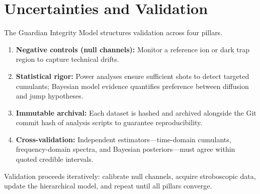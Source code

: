 \section{Uncertainties and Validation}
The Guardian Integrity Model structures validation across four pillars.
\begin{enumerate}
  \item \textbf{Negative controls (null channels):} Monitor a reference ion or dark trap region to capture technical drifts.
  \item \textbf{Statistical rigor:} Power analyses ensure sufficient shots to detect targeted cumulants; Bayesian model evidence quantifies preference between diffusion and jump hypotheses.
  \item \textbf{Immutable archival:} Each dataset is hashed and archived alongside the Git commit hash of analysis scripts to guarantee reproducibility.
  \item \textbf{Cross-validation:} Independent estimators—time-domain cumulants, frequency-domain spectra, and Bayesian posteriors—must agree within quoted credible intervals.
\end{enumerate}

Validation proceeds iteratively: calibrate null channels, acquire stroboscopic data, update the hierarchical model, and repeat until all pillars converge.

\begin{ValidationChecklist}
\end{ValidationChecklist}
